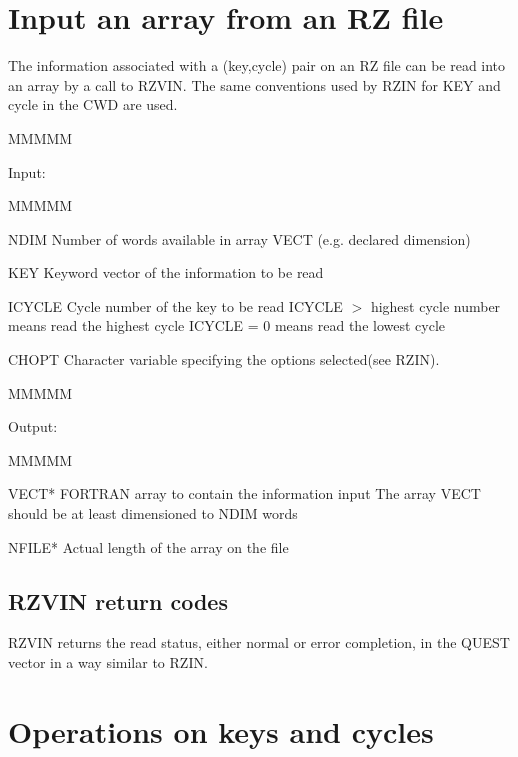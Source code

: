 \section{Input an array from an RZ file}
\par The information associated with a (key,cycle) pair on an RZ file can
be read into an array by a call to RZVIN.
The same conventions used by RZIN for KEY and cycle in the CWD are used.
\begin{DL}{MMMMM}
\item[Input:
]
\begin{DL}{MMMMM}
\item[NDIM
]Number of words available in array VECT (e.g. declared dimension)
\item[KEY
]Keyword vector of the information to be read
\item[ICYCLE
]Cycle number of the key to be read
\newline ICYCLE $>$ highest cycle number means read the highest cycle
\newline ICYCLE = 0 means read the lowest cycle
\item[CHOPT
]Character variable specifying the options selected(see RZIN).
\end{DL}
\end{DL}
\begin{DL}{MMMMM}
\item[Output:
]
\begin{DL}{MMMMM}
\item[VECT*
]FORTRAN array to contain the information input
\newline The array VECT should be at least dimensioned to NDIM words
\item[NFILE*
]Actual length of the array on the file
\end{DL}
\end{DL}
\subsection{RZVIN return codes}
\par RZVIN returns the read status, either normal or error completion,
in the QUEST vector in a way similar to RZIN.
\section{Operations on keys and cycles}
